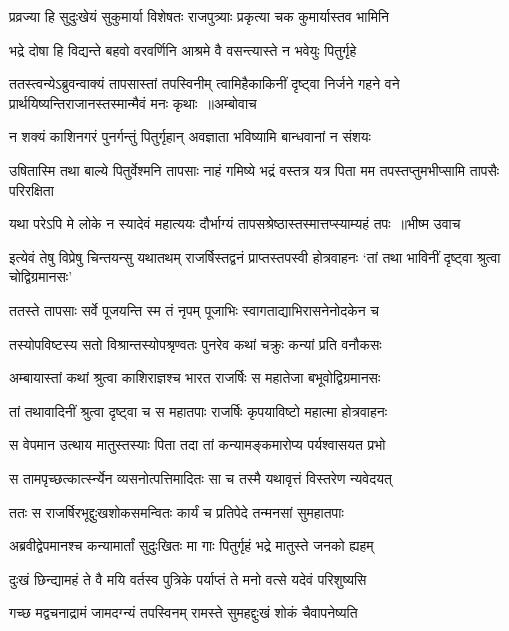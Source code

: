 \twolineshloka
{प्रव्रज्या हि सुदुःखेयं सुकुमार्या विशेषतः}
{राजपुत्र्याः प्रकृत्या चक कुमार्यास्तव भामिनि}


\twolineshloka
{भद्रे दोषा हि विद्यन्ते बहवो वरवर्णिनि}
{आश्रमे वै वसन्त्यास्ते न भवेयुः पितुर्गृहे}


ततस्त्वन्येऽब्रुवन्वाक्यं तापसास्तां तपस्विनीम्
\threelineshloka
{त्वामिहैकाकिनीं दृष्ट्वा निर्जने गहने वने}
{प्रार्थयिष्यन्तिराजानस्तस्मान्मैवं मनः कृथाः ॥अम्बोवाच}
{}


\twolineshloka
{न शक्यं काशिनगरं पुनर्गन्तुं पितुर्गृहान्}
{अवज्ञाता भविष्यामि बान्धवानां न संशयः}


\threelineshloka
{उषितास्मि तथा बाल्ये पितुर्वेश्मनि तापसाः}
{नाहं गमिष्ये भद्रं वस्तत्र यत्र पिता मम}
{तपस्तप्तुमभीप्सामि तापसैः परिरक्षिता}


\threelineshloka
{यथा परेऽपि मे लोके न स्यादेवं महात्ययः}
{दौर्भाग्यं तापसश्रेष्ठास्तस्मात्तप्स्याम्यहं तपः ॥भीष्म उवाच}
{}


\threelineshloka
{इत्येवं तेषु विप्रेषु चिन्तयन्सु यथातथम्}
{राजर्षिस्तद्वनं प्राप्तस्तपस्वी होत्रवाहनः}
{`तां तथा भाविनीं दृष्ट्वा श्रुत्वा चोद्विग्रमानसः'}


\twolineshloka
{ततस्ते तापसाः सर्वे पूजयन्ति स्म तं नृपम्}
{पूजाभिः स्वागताद्याभिरासनेनोदकेन च}


\twolineshloka
{तस्योपविष्टस्य सतो विश्रान्तस्योपश्रृण्वतः}
{पुनरेव कथां चक्रुः कन्यां प्रति वनौकसः}


\twolineshloka
{अम्बायास्तां कथां श्रुत्वा काशिराज्ञश्च भारत}
{राजर्षिः स महातेजा बभूवोद्विग्रमानसः}


\twolineshloka
{तां तथावादिनीं श्रुत्वा दृष्ट्वा च स महातपाः}
{राजर्षिः कृपयाविष्टो महात्मा होत्रवाहनः}


\twolineshloka
{स वेपमान उत्थाय मातुस्तस्याः पिता तदा}
{तां कन्यामङ्कमारोप्य पर्यश्वासयत प्रभो}


\twolineshloka
{स तामपृच्छत्कार्त्स्न्येन व्यसनोत्पत्तिमादितः}
{सा च तस्मै यथावृत्तं विस्तरेण न्यवेदयत्}


\twolineshloka
{ततः स राजर्षिरभूद्दुःखशोकसमन्वितः}
{कार्यं च प्रतिपेदे तन्मनसां सुमहातपाः}


\twolineshloka
{अब्रवीद्वेपमानश्च कन्यामार्तां सुदुःखितः}
{मा गाः पितुर्गृहं भद्रे मातुस्ते जनको ह्यहम्}


\twolineshloka
{दुःखं छिन्द्यामहं ते वै मयि वर्तस्व पुत्रिके}
{पर्याप्तं ते मनो वत्से यदेवं परिशुष्यसि}


\twolineshloka
{गच्छ मद्वचनाद्रामं जामदग्न्यं तपस्विनम्}
{रामस्ते सुमहद्दुःखं शोकं चैवापनेष्यति}


